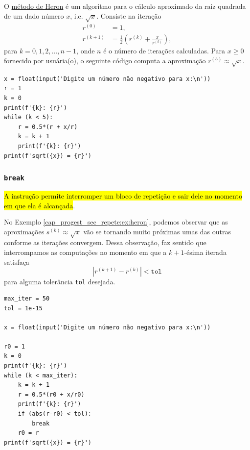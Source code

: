 \begin{ex}\label{cap_progest_sec_repete:ex:heron}
  O \href{https://en.wikipedia.org/wiki/Methods_of_computing_square_roots#Heron's_method}{método de Heron}{\heron} é um algoritmo para o cálculo aproximado da raiz quadrada de um dado número $x$, i.e. $\sqrt{x}$. Consiste na iteração
  \begin{align}
    r^{(0)} &= 1,\\
    r^{(k+1)} &= \frac{1}{2}\left(r^{(k)} + \frac{x}{r^{(k)}}\right),
  \end{align}
  para $k=0,1,2,\ldots,n-1$, onde $n$ é o número de iterações calculadas. Para $x\geq 0$ fornecido por usuária(o), o seguinte código computa a aproximação $r^{(5)}\approx \sqrt{x}$.

\begin{lstlisting}
x = float(input('Digite um número não negativo para x:\n'))
r = 1
k = 0
print(f'{k}: {r}')
while (k < 5):
    r = 0.5*(r + x/r)
    k = k + 1
    print(f'{k}: {r}')
print(f'sqrt({x}) = {r}')
\end{lstlisting}

\end{ex}

\subsubsection{\texttt{break}}

\hl{A instrução {\PYTHONbreak} permite interromper um bloco de repetição e sair dele no momento em que ela é alcançada}.

\begin{ex}\label{cap_progest_sec_repete:ex:heron_break}
  No Exemplo \ref{cap_progest_sec_repete:ex:heron}, podemos observar que as aproximações $s^{(k)}\approx \sqrt{x}$ vão se tornando muito próximas umas das outras conforme as iterações convergem. Dessa observação, faz sentido que interrompamos as computações no momento em que a $k+1$-ésima iterada satisfaça
  \begin{equation}
    \left|r^{(k+1)}-r^{(k)}\right| < \texttt{tol}
  \end{equation}
  para alguma tolerância \lstinline+tol+ desejada.

\begin{lstlisting}
max_iter = 50
tol = 1e-15

x = float(input('Digite um número não negativo para x:\n'))

r0 = 1
k = 0
print(f'{k}: {r}')
while (k < max_iter):
    k = k + 1
    r = 0.5*(r0 + x/r0)
    print(f'{k}: {r}')
    if (abs(r-r0) < tol):
        break
    r0 = r
print(f'sqrt({x}) = {r}')
\end{lstlisting}

\end{ex}

